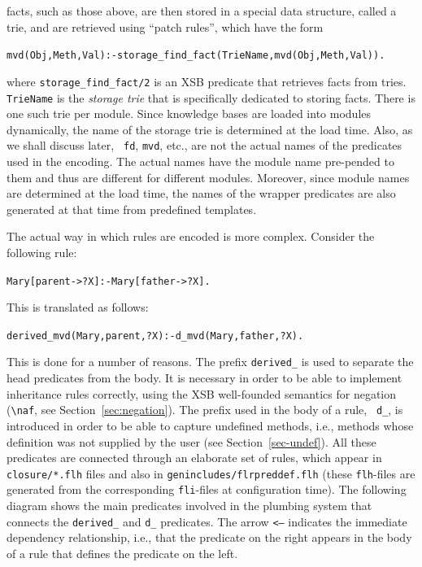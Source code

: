 \documentclass[11pt]{article}
\newcommand{\ERGO}{\mbox{\smaller{\ensuremath{\cal{E}}\smaller{{\sc{RGO}}}}}\xspace}
\newcommand{\FLSYSTEM}{\ERGO}
\newcommand{\bs}{\textbackslash}
\newcommand{\RULELOGNAF}{{\texttt{{\bs}naf}}\xspace}
\begin{document}
\FLSYSTEM facts, such as those above, are then stored in a special data structure,
called a {\rm trie}, and are retrieved using  ``patch rules'', which have the
form
\begin{alltt}
   mvd(Obj,Meth,Val) :- storage\_find\_fact(TrieName, mvd(Obj,Meth,Val)).  
\end{alltt}
where {\tt storage\_find\_fact/2} is an XSB predicate that retrieves facts
from tries. {\tt TrieName} is the \emph{storage trie} that is specifically
dedicated to storing facts. There is one such trie per module. Since
knowledge bases are loaded into modules dynamically, the name of the storage trie
is determined at the load time. Also, as we shall discuss later, {\tt
  fd}, {\tt mvd}, etc., are not the actual names of the predicates used in
the encoding. The actual names have the module name pre-pended to them and
thus are different for different modules. Moreover, since module names are
determined at the load time, the names of the wrapper predicates are
also generated at that time from predefined templates.

The actual way in which \FLSYSTEM rules are encoded is more complex. Consider the following rule:
\begin{alltt}
    Mary[parent->?X] :- Mary[father->?X].  
\end{alltt}
This is translated as follows:
\begin{alltt}
    derived\_mvd(Mary,parent,?X) :- d\_mvd(Mary,father,?X).  
\end{alltt}
This is done for a number of reasons. The prefix {\tt derived\_} is used to
separate the head predicates from the body. It is necessary in order to
be able to implement inheritance rules correctly, using the XSB
well-founded semantics for negation (\RULELOGNAF, see
Section~\ref{sec:negation}). The prefix used in the body of a rule, {\tt
  d\_}, is introduced in order to be able to capture undefined methods,
i.e., methods whose definition was not supplied by the user (see
Section~\ref{sec-undef}). All these predicates are connected through an
elaborate set of rules, which appear in {\tt closure/*.flh} files and also
in {\tt genincludes/flrpreddef.flh} (these {\tt flh}-files are generated
from the corresponding {\tt fli}-files at \FLSYSTEM configuration time).
The following diagram shows the main
predicates involved in the plumbing system that connects
the {\tt derived\_} and {\tt d\_} predicates. The arrow {\tt <---} indicates the
immediate dependency relationship, i.e., that the predicate on the
right appears in the body of a rule that defines the predicate on the left.
\end{document}
